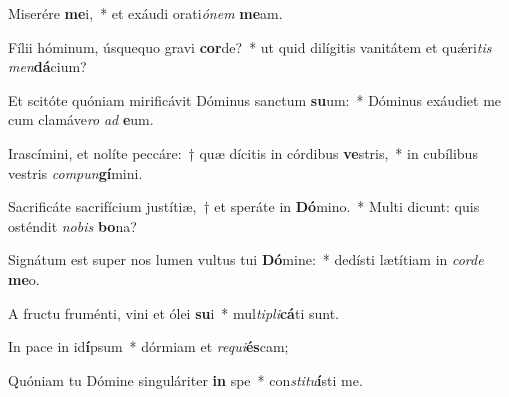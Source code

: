 \item Miserére \textbf{me}i,~* et exáudi orati\textit{ónem} \textbf{me}am.
\item Fílii hóminum, úsquequo gravi \textbf{cor}de?~* ut quid dilígitis vanitátem et quǽri\textit{tis} \textit{men}\textbf{dá}cium?
\item Et scitóte quóniam mirificávit Dóminus sanctum \textbf{su}um:~* Dóminus exáudiet me cum clamáve\textit{ro} \textit{ad} \textbf{e}um.
\item Irascímini, et nolíte peccáre:~† quæ dícitis in córdibus \textbf{ve}stris,~* in cubílibus vestris \textit{compun}\textbf{gí}mini.
\item Sacrificáte sacrifícium justítiæ,~† et speráte in \textbf{Dó}mino.~* Multi dicunt: quis osténdit \textit{nobis} \textbf{bo}na?
\item Signátum est super nos lumen vultus tui \textbf{Dó}mine:~* dedísti lætítiam in \textit{corde} \textbf{me}o.
\item A fru\-ctu fruménti, vini et ólei \textbf{su}i~* mul\textit{tipli}\textbf{cá}ti sunt.
\item In pace in id\textbf{í}psum~* dórmiam et \textit{requi}\textbf{és}cam;
\item Quóniam tu Dómine singuláriter \textbf{in} spe~* con\textit{stitu}\textbf{í}sti me.
